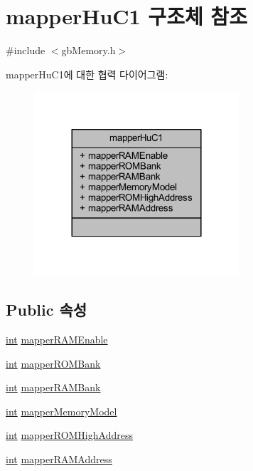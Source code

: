 \hypertarget{structmapper_hu_c1}{}\section{mapper\+Hu\+C1 구조체 참조}
\label{structmapper_hu_c1}


{\ttfamily \#include $<$gb\+Memory.\+h$>$}



mapper\+Hu\+C1에 대한 협력 다이어그램\+:\nopagebreak
\begin{figure}[H]
\begin{center}
\leavevmode
\includegraphics[width=216pt]{structmapper_hu_c1__coll__graph}
\end{center}
\end{figure}
\subsection*{Public 속성}
\begin{DoxyCompactItemize}
\item 
\mbox{\hyperlink{_util_8cpp_a0ef32aa8672df19503a49fab2d0c8071}{int}} \mbox{\hyperlink{structmapper_hu_c1_abed6ba52cc80f9c0571ecc9a4673c253}{mapper\+R\+A\+M\+Enable}}
\item 
\mbox{\hyperlink{_util_8cpp_a0ef32aa8672df19503a49fab2d0c8071}{int}} \mbox{\hyperlink{structmapper_hu_c1_a7fb083af2e79a98adbcc83ff4d039c6e}{mapper\+R\+O\+M\+Bank}}
\item 
\mbox{\hyperlink{_util_8cpp_a0ef32aa8672df19503a49fab2d0c8071}{int}} \mbox{\hyperlink{structmapper_hu_c1_a0199405980430215b615fa9fd3e46a19}{mapper\+R\+A\+M\+Bank}}
\item 
\mbox{\hyperlink{_util_8cpp_a0ef32aa8672df19503a49fab2d0c8071}{int}} \mbox{\hyperlink{structmapper_hu_c1_a22afbac167276896703576f5e237f141}{mapper\+Memory\+Model}}
\item 
\mbox{\hyperlink{_util_8cpp_a0ef32aa8672df19503a49fab2d0c8071}{int}} \mbox{\hyperlink{structmapper_hu_c1_a016a39f55f5441bdaed916ff0477e0c6}{mapper\+R\+O\+M\+High\+Address}}
\item 
\mbox{\hyperlink{_util_8cpp_a0ef32aa8672df19503a49fab2d0c8071}{int}} \mbox{\hyperlink{structmapper_hu_c1_af122d3984f260f428d007fa095d2df27}{mapper\+R\+A\+M\+Address}}
\end{DoxyCompactItemize}


